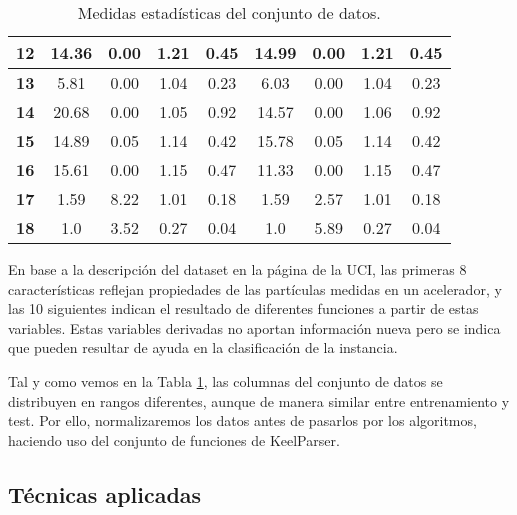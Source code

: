 \begin{table}[H]
\begin{tabular}{c|c|c|c|c||c|c|c|c|}
    \multicolumn{1}{|c|}{\textbf{12}}         & 14.36  & 0.00   & 1.21    & 0.45        & 14.99  & 0.00   & 1.21    & 0.45              \\ \hline
    \multicolumn{1}{|c|}{\textbf{13}}         & 5.81   & 0.00   & 1.04    & 0.23        & 6.03   & 0.00   & 1.04    & 0.23              \\ \hline
    \multicolumn{1}{|c|}{\textbf{14}}         & 20.68  & 0.00   & 1.05    & 0.92        & 14.57  & 0.00   & 1.06    & 0.92              \\ \hline
    \multicolumn{1}{|c|}{\textbf{15}}         & 14.89  & 0.05   & 1.14    & 0.42        & 15.78  & 0.05   & 1.14    & 0.42              \\ \hline
    \multicolumn{1}{|c|}{\textbf{16}}         & 15.61  & 0.00   & 1.15    & 0.47        & 11.33  & 0.00   & 1.15    & 0.47              \\ \hline
    \multicolumn{1}{|c|}{\textbf{17}}         & 1.59   & 8.22   & 1.01    & 0.18        & 1.59   & 2.57   & 1.01    & 0.18              \\ \hline
    \multicolumn{1}{|c|}{\textbf{18}}         & 1.0    & 3.52   & 0.27    & 0.04        & 1.0    & 5.89   & 0.27    & 0.04              \\ \hline
    \end{tabular}
    \caption{Medidas estadísticas del conjunto de datos.}
    \label{statistics}
\end{table}

En base a la descripción del dataset en la página de la UCI, las primeras 8 características reflejan propiedades de las partículas medidas en un acelerador, y las 10 siguientes indican el resultado de diferentes funciones a partir de estas variables. Estas variables derivadas no aportan información nueva pero se indica que pueden resultar de ayuda en la clasificación de la instancia.

\vspace{\baselineskip}

Tal y como vemos en la Tabla \ref{statistics}, las columnas del conjunto de datos se distribuyen en rangos diferentes, aunque de manera similar entre entrenamiento y test. Por ello, normalizaremos los datos antes de pasarlos por los algoritmos, haciendo uso del conjunto de funciones de KeelParser.

\newpage

\subsection{Técnicas aplicadas}

